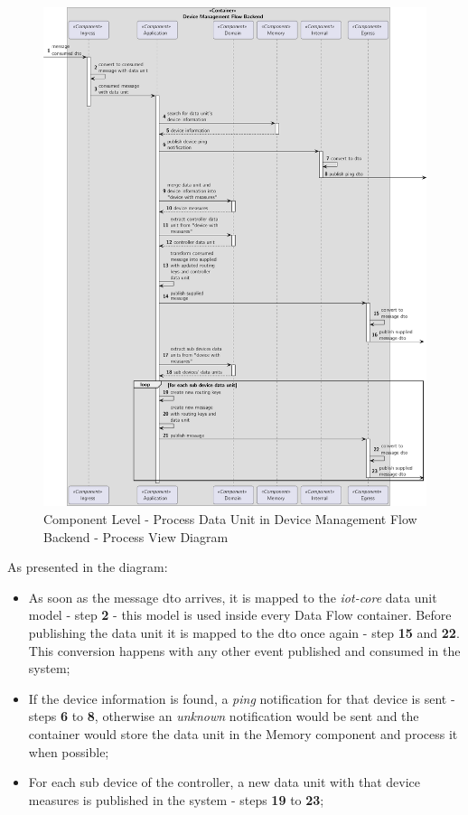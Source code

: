 \begin{figure}[H]
   \centering
   \includegraphics[page=1,width=\columnwidth]{assets/diagrams/design/architectural/level3/process/device-management-flow-backend.pdf}
   \caption[Component Level - Process Data Unit in Device Management Flow Backend - Process View Diagram]{Component Level - Process Data Unit in Device Management Flow Backend - Process View Diagram}
   \label{fig:design:architecture:platform:component:process:diagram:device}
\end{figure}

As presented in the diagram:

\begin{itemize}
   \item As soon as the message dto arrives, it is mapped to the \textit{iot-core} data unit model - step \textbf{2} - this model is used inside every Data Flow container. Before publishing the data unit it is mapped to the dto once again - step \textbf{15} and \textbf{22}. This conversion happens with any other event published and consumed in the system;
   \item If the device information is found, a \textit{ping} notification for that device is sent - steps \textbf{6} to \textbf{8}, otherwise an \textit{unknown} notification would be sent and the container would store the data unit in the Memory component and process it when possible;
   \item For each sub device of the controller, a new data unit with that device measures is published in the system - steps \textbf{19} to \textbf{23};
\end{itemize}

